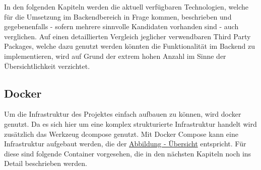 	\newpage
	In den folgenden Kapiteln werden die aktuell verfügbaren Technologien, welche für die Umsetzung im Backendbereich in Frage kommen, beschrieben und gegebenenfalls - sofern mehrere sinnvolle Kandidaten vorhanden sind - auch verglichen. Auf einen detaillierten Vergleich jeglicher verwendbaren Third Party Packages, welche dazu genutzt werden könnten die Funktionalität im Backend zu implementieren, wird auf Grund der extrem hohen Anzahl im Sinne der Übersichtlichkeit verzichtet.
	\subsection{Docker}
	Um die Infrastruktur des Projektes einfach aufbauen zu können, wird \Gls{docker} genutzt. Da es sich hier um eine komplex strukturierte Infrastruktur handelt wird zusätzlich das Werkzeug \Gls{dcompose} genutzt. Mit Docker Compose kann eine Infrastruktur aufgebaut werden, die der \hyperref[fig:uebersicht]{Abbildung - Übersicht} entspricht. Für diese sind folgende Container vorgesehen, die in den nächsten Kapiteln noch ins Detail beschrieben werden.
